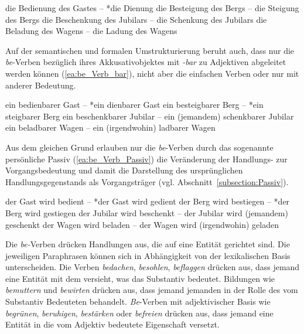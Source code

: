 \ea \label{ea:be_Verb_ung}
\ea \label{ea:Bedienung} die Bedienung des Gastes -- *die Dienung
\ex \label{ex:Besteigung} die Besteigung des Bergs -- die Steigung des Bergs
\ex \label{ex:Beschenkung} die Beschenkung des Jubilars -- die Schenkung des Jubilars
\ex \label{ex:Beladung} die Beladung des Wagens -- die Ladung des Wagens
\z 
\z 

Auf der semantischen und formalen Umstrukturierung beruht auch, dass nur die \textit{be}-Verben bezüglich ihres Akkusativobjektes mit \textit{-bar} zu Adjektiven abgeleitet werden können (\ref{ea:be_Verb_bar}), nicht aber die einfachen Verben oder nur mit anderer Bedeutung.

\ea \label{ea:be_Verb_bar}
\ea \label{ea:bedienbar} ein bedienbarer Gast -- *ein dienbarer Gast
\ex \label{ex:besteigbar} ein besteigbarer Berg -- *ein steigbarer Berg
\ex \label{ex:beschenkbar} ein beschenkbarer Jubilar -- ein (jemandem) schenkbarer Jubilar
\ex \label{ex:beladbar} ein beladbarer Wagen -- ein (irgendwohin) ladbarer Wagen
\z 
\z 

Aus dem gleichen Grund erlauben nur die \textit{be}-Verben durch das sogenannte persönliche Passiv (\ref{ea:be_Verb_Passiv}) die Veränderung der Handlungs- zur Vorgangsbedeutung und damit die Darstellung des ursprünglichen Handlungsgegenstands als Vorgangsträger (vgl. Abschnitt~\ref{subsection:Passiv}).

\ea \label{ea:be_Verb_Passiv}
\ea \label{ea:wirdbedient} der Gast wird bedient -- *der Gast wird gedient
\ex \label{ex:wirdbestiegen} der Berg wird bestiegen -- *der Berg wird gestiegen
\ex \label{ex:wirdbeschenkt} der Jubilar wird beschenkt -- der Jubilar wird (jemandem) geschenkt
\ex \label{ex:wirdbeladen} der Wagen wird beladen -- der Wagen wird (irgendwohin) geladen
\z 
\z 

Die \textit{be-}Verben drücken Handlungen aus, die auf eine Entität gerichtet sind. Die jeweiligen Paraphrasen können sich in Abhängigkeit von der lexikalischen Basis unterscheiden. Die Verben \textit{bedachen}, \textit{besohlen}, \textit{beflaggen} drücken aus, dass jemand eine Entität mit dem versieht, was das Substantiv bedeutet. Bildungen wie \textit{bemuttern} und \textit{bewirten} drücken aus, dass jemand jemanden in der Rolle des vom Substantiv Bedeuteten behandelt. \textit{Be}-Verben mit adjektivischer Basis wie \textit{begrünen}, \textit{beruhigen}, \textit{bestärken} oder \textit{befreien} drücken aus, dass jemand eine Entität in die vom Adjektiv bedeutete Eigenschaft versetzt.


